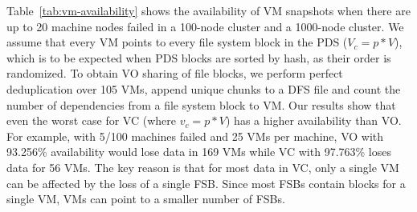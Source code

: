  Table~\ref{tab:vm-availability} shows the availability of VM snapshots when 
there are up to 20 machine nodes failed in a 100-node cluster and  a 1000-node cluster. 
We assume that every VM points to every file system block in the PDS ($V_c=p*V$), which is to be expected when PDS
blocks are sorted by hash, as their order is randomized.
To obtain VO sharing of file blocks, we perform perfect deduplication over 105 VMs, 
append unique chunks to a DFS file and
count the number of dependencies from a file system block to VM.
Our results show that even the worst case for VC (where $v_c=p*V$) has a higher availability than VO.
For example, with 5/100 machines failed and 25 VMs per machine, VO with 93.256\% availability would lose data in 169 VMs 
while VC with 97.763\% loses data for 56 VMs.
The key reason is that for most data in VC, only a single
VM can be affected by the loss of a single FSB. Since most FSBs contain blocks for a single VM, VMs can point to a smaller number of FSBs.

